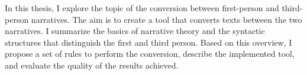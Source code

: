 In this thesis, I explore the topic of the conversion between first-person and third-person narratives. The aim is to create a tool that converts texts between the two narratives. I summarize the basics of narrative theory and the syntactic structures that distinguish the first and third person. Based on this overview, I propose a set of rules to perform the conversion, describe the implemented tool, and evaluate the quality of the results achieved.

